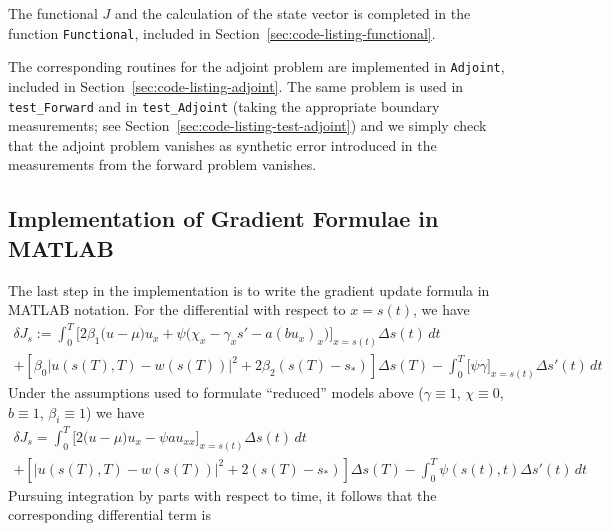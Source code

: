 \documentclass[letterpaper, 10pt, draft]{amsart}
\theoremstyle{definition}
\theoremstyle{remark}
\newcommand{\lnorm}[1]{\left\vert #1\right\vert}%
\begin{document}
The functional $J$ and the calculation of the state vector is completed in the
function \verb+Functional+, included in Section~\ref{sec:code-listing-functional}.

The corresponding routines for the adjoint problem are implemented in \verb+Adjoint+, included in Section~\ref{sec:code-listing-adjoint}.
The same problem is used in \verb+test_Forward+ and in \verb+test_Adjoint+
(taking the appropriate boundary measurements; see
Section~\ref{sec:code-listing-test-adjoint}) and we simply check that the
adjoint problem vanishes as synthetic error introduced in the measurements from
the forward problem vanishes.

\subsection{Implementation of Gradient Formulae in MATLAB}
The last step in the implementation is to write the gradient update formula in MATLAB notation.
For the differential with respect to $x=s(t)$, we have
\begin{gather}
  {\delta J}_{s}
  := \int_0^T \Big[2\beta_1\big(u - \mu\big)u_x + \psi \big(\chi_x - \gamma_x s'  - a (b u_x)_x \big)\Big]_{x=s(t)} {\Delta s}(t)\,dt \nonumber
  \\
  +
  \left[\beta_0\lnorm{u(s(T),T) - w(s(T))}^2 + 2 \beta_2 (s(T) - s_*)\right] {\Delta s}(T) 
  - \int_0^T \big[\psi \gamma\big]_{x=s(t)} {\Delta s}'(t) \,dt\label{eq:gradient-wrt-s-original}
\end{gather}
Under the assumptions used to formulate ``reduced'' models above ($\gamma \equiv
1$, $\chi \equiv 0$, $b\equiv 1$, $\beta_i \equiv 1$) we have
\begin{gather}
  {\delta J}_{s}
  = \int_0^T \Big[2\big(u - \mu\big)u_x - \psi  a u_{xx} \Big]_{x=s(t)} {\Delta s}(t)\,dt \nonumber
  \\
  +
  \left[\lnorm{u(s(T),T) - w(s(T))}^2 + 2 (s(T) - s_*)\right] {\Delta s}(T) 
  - \int_0^T \psi(s(t),t) {\Delta s}'(t) \,dt\label{eq:gradient-wrt-s-reduced}
\end{gather}
Pursuing integration by parts with respect to time, it follows that the corresponding differential term is
\end{document}
